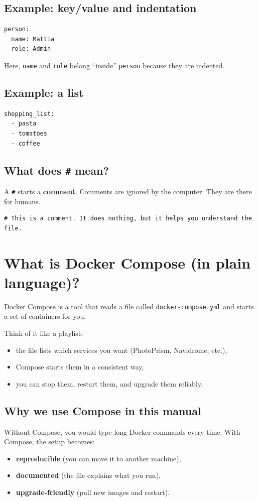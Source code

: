 \subsection*{Example: key/value and indentation}
\begin{lstlisting}
person:
  name: Mattia
  role: Admin
\end{lstlisting}
Here, \texttt{name} and \texttt{role} belong ``inside'' \texttt{person} because they are indented.

\subsection*{Example: a list}
\begin{lstlisting}
shopping_list:
  - pasta
  - tomatoes
  - coffee
\end{lstlisting}

\subsection*{What does \texttt{\#} mean?}
A \texttt{\#} starts a \textbf{comment}. Comments are ignored by the computer.
They are there for humans.

\begin{lstlisting}
# This is a comment. It does nothing, but it helps you understand the file.
\end{lstlisting}


\section{What is Docker Compose (in plain language)?}
Docker Compose is a tool that reads a file called \texttt{docker-compose.yml} and starts a set of containers for you.

Think of it like a playlist:
\begin{itemize}[leftmargin=*]
  \item the file lists which services you want (PhotoPrism, Navidrome, etc.),
  \item Compose starts them in a consistent way,
  \item you can stop them, restart them, and upgrade them reliably.
\end{itemize}

\subsection*{Why we use Compose in this manual}
Without Compose, you would type long Docker commands every time.
With Compose, the setup becomes:
\begin{itemize}[leftmargin=*]
  \item \textbf{reproducible} (you can move it to another machine),
  \item \textbf{documented} (the file explains what you run),
  \item \textbf{upgrade-friendly} (pull new images and restart).
\end{itemize}

